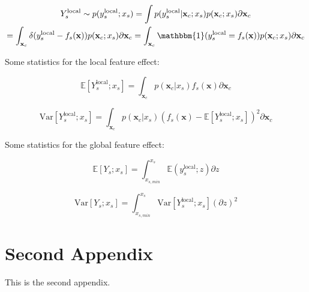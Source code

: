 \documentclass[wcp]{jmlr}
\newcommand{\xc}{\mathbf{x}_c}
\newcommand{\Ysloc}{Y_{s}^{\text{local}}}
\newcommand{\ysloc}{y_{s}^{\text{local}}}
\newcommand{\x}{\mathbf{x}}
\newcommand{\E}{\mathbb{E}}
\newcommand{\var}{\mathrm{Var}}
\newcommand{\1}{\mathbbm{1}}
\begin{document}
\begin{multline}
    \Ysloc \sim p(\ysloc ; x_s)
    = \int{} p(\ysloc|\xc;x_s) p(\xc;x_s) \partial \xc \\
    = \int_{\xc} \delta(\ysloc-f_s(\x)) p(\xc;x_s) \partial \xc
    = \int_{\xc} \1(\ysloc=f_s(\x)) p(\xc;x_s) \partial \xc
\end{multline}

Some statistics for the local feature effect:

\begin{equation}
  \E[ \Ysloc ; x_s] = \int_{\xc} p(\xc|x_s) f_s(\x) \partial \xc
\end{equation}

\begin{equation}
  \var[ \Ysloc ; x_s] = \int_{\xc} p(\xc|x_s) (f_s(\x) - \E[ \Ysloc ; x_s])^2 \partial \xc
\end{equation}

Some statistics for the global feature effect:

\begin{equation}
  \E[Y_s ; x_s] = \int_{x_{s,min}}^{x_s} \E(\ysloc;z) \partial z
\end{equation}

\begin{equation}
  \var[Y_s ; x_s] = \int_{x_{s,min}}^{x_s} \var[ \Ysloc ; x_s] (\partial z)^2
\end{equation}


\section{Second Appendix}\label{apd:second}

This is the second appendix.
\end{document}
